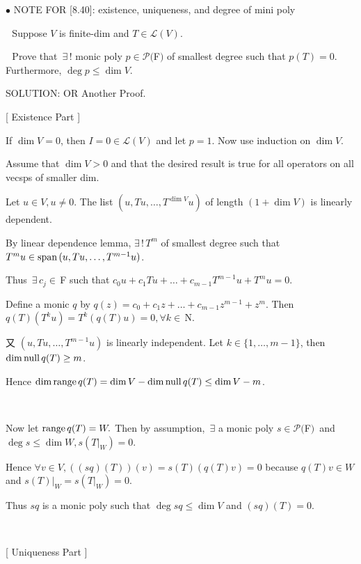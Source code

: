 \documentclass[a4paper, 11pt, UTF8]{article}
\def\range{\textup{range}\,}
\def\null{\textup{null\,}}
\def\Spn{\textup{span}\,}
\def\Lm{\mathcal{L}}
\def\Po{\mathcal{P}}
\def\Fbf{$\,{\timesbf F}\,$}
\def\Nbfc{$\,{\timesbf N}$}
\begin{document}
\begin{large}
{\small $\bullet$} {\timesbf\Large N{\normalsize OTE} F{\normalsize OR} [8.40]:} {\timessl\normalsize existence, uniqueness, and degree of mini poly}\par\,\,
{\timessl\Large Suppose $V$ is finite-dim} {\timessl and $T \in \Lm(V)$.}\par\,\,
{\timessl Prove that $\,\exists\,!$ monic poly $p \in \Po(${\timesbf F}$)$ of smallest degree such that $p(T) = 0$. Furthermore, $\deg p\leq \dim V$.}\par
{\timesbf S\footnotesize{OLUTION:}} O{\small R} Another Proof.\par\quad
{\LARGE[} {\timessl\Large Existence Part} {\LARGE]}\par\quad
If $\dim V = 0$, then $I=0\in\Lm(V)$ and let $p=1$. Now use induction on $\dim V$.\par\quad
{\timessl Assume that $\dim V > 0$ and that the desired result is true for all operators on all vecsps of smaller dim.}\par\quad
Let $u\in V,u\neq 0$. The list $(u, Tu, \dots, T^{\dim V} u)$ of length $(1 + \dim V)$ is linearly dependent.\par\quad
By linear dependence lemma, $\exists\,!\,T^{m}$ of smallest degree such that $T^m u\in\Spn(u, Tu, \dots, T^{m-1} u)$.\par\quad
Thus $\,\exists\,c_j\in\Fbf\,$such that $c_0 u + c_1 Tu +\dots + c_{m-1} T^{m-1} u + T^m u = 0$.\par\quad
Define a monic $q$ by
$q(z) = c_0 + c_1 z + \dots + c_{m-1} z^{m-1} + z^m$. Then $q(T)(T^k u)=T^k(q(T)u)=0, \forall k\in\Nbfc.$\par\quad
又 $(u, Tu, \dots , T^{m-1} u)$ is linearly independent. Let $k\in\{1,\dots,m-1\}$, then $\dim\null q(T) \geq m$.\par\quad
Hence $\dim \range q(T) = \dim V - \dim \null q(T) \leq \dim V - m$.\par{\tiny\,\par}\quad
Now let $\range q(T)=W.$ Then by {\timessl assumption}, $\,\exists$ a monic poly $s\in\Po(${\timesbf F}$)$ \,{\small and}\, $\deg s\leq\dim W,s(T|_W ) = 0$.\par\quad
Hence $\forall v\in V,((sq)(T))(v) = s(T)(q(T)v) = 0$ because $q(T)v\in W$ and $s(T)|_W = s(T|_W ) = 0$.\par\quad
Thus $sq$ is a monic poly such that $\deg sq\leq \dim V$ and $(sq)(T) = 0$.\par{\tiny\,\par}\quad
{\LARGE[} {\timessl\Large Uniqueness Part} {\LARGE]}\par\quad

\end{large}
\end{document}
